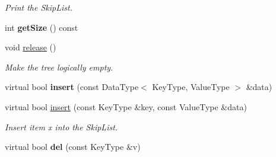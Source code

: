 \begin{CompactItemize}
\begin{CompactList}\small\item\em Print the SkipList. \item\end{CompactList}\item 
\hypertarget{classSkipList_3_01ValueType_00_01KeyType_00_01MAX__GAP_00_01MemStorage_00_01LockType_01_4_2578ac7158c6634ab984f6c5cb8e67e7}{
int \textbf{getSize} () const }
\label{classSkipList_3_01ValueType_00_01KeyType_00_01MAX__GAP_00_01MemStorage_00_01LockType_01_4_2578ac7158c6634ab984f6c5cb8e67e7}

\item 
\hypertarget{classSkipList_3_01ValueType_00_01KeyType_00_01MAX__GAP_00_01MemStorage_00_01LockType_01_4_537eaa21e761eb40aa29d487b01c31bd}{
void \hyperlink{classSkipList_3_01ValueType_00_01KeyType_00_01MAX__GAP_00_01MemStorage_00_01LockType_01_4_537eaa21e761eb40aa29d487b01c31bd}{release} ()}
\label{classSkipList_3_01ValueType_00_01KeyType_00_01MAX__GAP_00_01MemStorage_00_01LockType_01_4_537eaa21e761eb40aa29d487b01c31bd}

\begin{CompactList}\small\item\em Make the tree logically empty. \item\end{CompactList}\item 
\hypertarget{classSkipList_3_01ValueType_00_01KeyType_00_01MAX__GAP_00_01MemStorage_00_01LockType_01_4_cc0a8c1df0eed6063ae5ca43e090bb53}{
virtual bool \textbf{insert} (const DataType$<$ KeyType, ValueType $>$ \&data)}
\label{classSkipList_3_01ValueType_00_01KeyType_00_01MAX__GAP_00_01MemStorage_00_01LockType_01_4_cc0a8c1df0eed6063ae5ca43e090bb53}

\item 
\hypertarget{classSkipList_3_01ValueType_00_01KeyType_00_01MAX__GAP_00_01MemStorage_00_01LockType_01_4_cf53180a75a050d2a4e47eebd584dfc3}{
virtual bool \hyperlink{classSkipList_3_01ValueType_00_01KeyType_00_01MAX__GAP_00_01MemStorage_00_01LockType_01_4_cf53180a75a050d2a4e47eebd584dfc3}{insert} (const KeyType \&key, const ValueType \&data)}
\label{classSkipList_3_01ValueType_00_01KeyType_00_01MAX__GAP_00_01MemStorage_00_01LockType_01_4_cf53180a75a050d2a4e47eebd584dfc3}

\begin{CompactList}\small\item\em Insert item x into the SkipList. \item\end{CompactList}\item 
\hypertarget{classSkipList_3_01ValueType_00_01KeyType_00_01MAX__GAP_00_01MemStorage_00_01LockType_01_4_658578f6e15d56c053558e6f793a35c1}{
virtual bool \textbf{del} (const KeyType \&v)}
\label{classSkipList_3_01ValueType_00_01KeyType_00_01MAX__GAP_00_01MemStorage_00_01LockType_01_4_658578f6e15d56c053558e6f793a35c1}


\end{CompactItemize}
